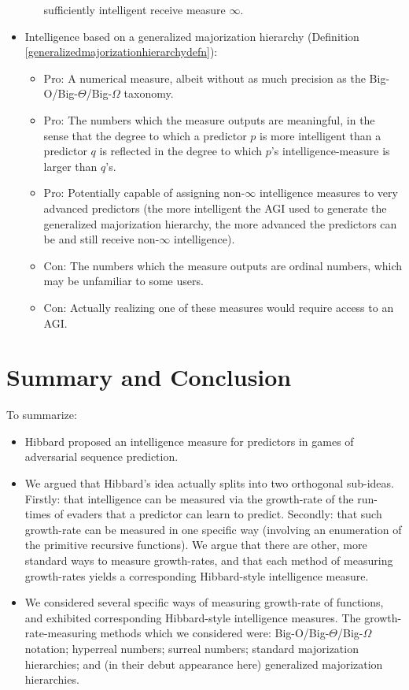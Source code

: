 \documentclass{article}
\begin{document}
\begin{itemize}
\begin{itemize}
        sufficiently intelligent receive measure $\infty$.
    \end{itemize}
    \item
    Intelligence based on a generalized majorization hierarchy
    (Definition \ref{generalizedmajorizationhierarchydefn}):
    \begin{itemize}
        \item
        Pro: A numerical measure, albeit without as much precision as the
        Big-O/Big-$\Theta$/Big-$\Omega$ taxonomy.
        \item
        Pro: The numbers which the measure outputs are meaningful, in the sense that
        the degree to which a predictor $p$ is more
        intelligent than a predictor $q$ is reflected
        in the degree to which $p$'s intelligence-measure is larger than $q$'s.
        \item
        Pro: Potentially capable of assigning non-$\infty$ intelligence measures to
        very advanced predictors (the more intelligent the AGI used to generate the
        generalized majorization hierarchy, the more advanced the predictors can be
        and still receive non-$\infty$ intelligence).
        \item
        Con: The numbers which the measure outputs are ordinal numbers, which may be
        unfamiliar to some users.
        \item
        Con: Actually realizing one of these measures would require access to an AGI.
    \end{itemize}
\end{itemize}

\section{Summary and Conclusion}
\label{conclusionsection}

To summarize:
\begin{itemize}
    \item
    Hibbard proposed \cite{hibbard} an intelligence measure for predictors
    in games of adversarial sequence prediction.
    \item
    We argued that Hibbard's idea actually splits into two orthogonal sub-ideas.
    Firstly: that intelligence can be measured via the growth-rate of the run-times
    of evaders that a predictor can learn to predict. Secondly: that such growth-rate can
    be measured in one specific way (involving an enumeration of the primitive recursive
    functions). We argue that there are other, more standard ways to measure growth-rates,
    and that each method of measuring growth-rates yields a corresponding Hibbard-style
    intelligence measure.
    \item
    We considered several specific ways of measuring growth-rate of functions, and exhibited
    corresponding Hibbard-style intelligence measures. The growth-rate-measuring methods
    which we considered were: Big-O/Big-$\Theta$/Big-$\Omega$ notation; hyperreal numbers;
    surreal numbers; standard majorization hierarchies; and (in their debut appearance here)
    generalized majorization hierarchies.
\end{itemize}




\end{document}
